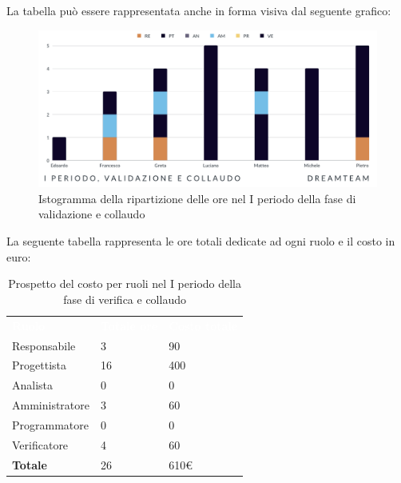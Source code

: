 La tabella può essere rappresentata anche in forma visiva dal seguente grafico:
\begin{figure}[H]
\centering
\includegraphics[scale=0.65]{Sezioni/SezioniPreventivo/grafici/Validazione_collaudo_I_periodo.png}
\caption{Istogramma della ripartizione delle ore nel I periodo della fase di validazione e collaudo}
\end{figure}

La seguente tabella rappresenta le ore totali dedicate ad ogni ruolo e il costo in euro:

\begin{table}[H]
\begin{center}
\renewcommand{\arraystretch}{1.5}
\begin{tabular}{ m{}<{\centering}  m{}<{\centering} m{}<{\centering}}
	\rowcolor{darkblue}
	\textcolor{white}{\textbf{Ruolo}}&\textcolor{white}{\textbf{Totale ore}}&\textcolor{white}{\textbf{Costo totale}}\\ 

	Responsabile  & 3 & 90 \\	
	
	Progettista & 16 & 400 \\
	
	Analista & 0 & 0 \\

	Amministratore & 3 & 60 \\
	
	Programmatore & 0 & 0 \\
	
	Verificatore & 4 & 60 \\
	
	\textbf{Totale} & 26 & 610\euro \\
	
\end{tabular}
\caption{Prospetto del costo per ruoli nel I periodo della fase di verifica e collaudo}
\end{center}
\end{table}

